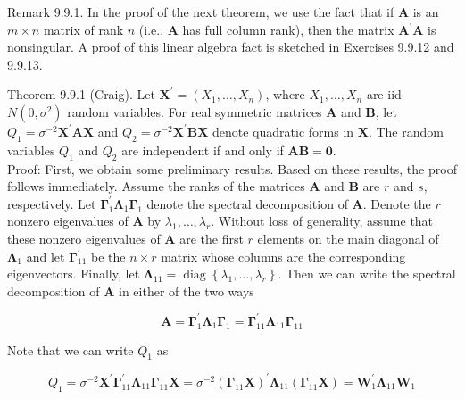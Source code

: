 Remark 9.9.1. In the proof of the next theorem, we use the fact that if $\mathbf{A}$ is an $m \times n$ matrix of rank $n$ (i.e., $\mathbf{A}$ has full column rank), then the matrix $\mathbf{A}^{\prime} \mathbf{A}$ is nonsingular. A proof of this linear algebra fact is sketched in Exercises 9.9.12 and 9.9.13.

Theorem 9.9.1 (Craig). Let $\mathbf{X}^{\prime}=\left(X_{1}, \ldots, X_{n}\right)$, where $X_{1}, \ldots, X_{n}$ are iid $N\left(0, \sigma^{2}\right)$ random variables. For real symmetric matrices $\mathbf{A}$ and $\mathbf{B}$, let $Q_{1}=\sigma^{-2} \mathbf{X}^{\prime} \mathbf{A X}$ and $Q_{2}=\sigma^{-2} \mathbf{X}^{\prime} \mathbf{B X}$ denote quadratic forms in $\mathbf{X}$. The random variables $Q_{1}$ and $Q_{2}$ are independent if and only if $\mathbf{A B}=\mathbf{0}$.\\
Proof: First, we obtain some preliminary results. Based on these results, the proof follows immediately. Assume the ranks of the matrices $\mathbf{A}$ and $\mathbf{B}$ are $r$ and $s$, respectively. Let $\boldsymbol{\Gamma}_{1}^{\prime} \boldsymbol{\Lambda}_{1} \boldsymbol{\Gamma}_{1}$ denote the spectral decomposition of $\mathbf{A}$. Denote the $r$ nonzero eigenvalues of $\mathbf{A}$ by $\lambda_{1}, \ldots, \lambda_{r}$. Without loss of generality, assume that these nonzero eigenvalues of $\mathbf{A}$ are the first $r$ elements on the main diagonal of $\boldsymbol{\Lambda}_{1}$ and let $\boldsymbol{\Gamma}_{11}^{\prime}$ be the $n \times r$ matrix whose columns are the corresponding eigenvectors. Finally, let $\boldsymbol{\Lambda}_{11}=\operatorname{diag}\left\{\lambda_{1}, \ldots, \lambda_{r}\right\}$. Then we can write the spectral decomposition of $\mathbf{A}$ in either of the two ways


\begin{equation*}
\mathbf{A}=\boldsymbol{\Gamma}_{1}^{\prime} \boldsymbol{\Lambda}_{1} \boldsymbol{\Gamma}_{1}=\boldsymbol{\Gamma}_{11}^{\prime} \boldsymbol{\Lambda}_{11} \boldsymbol{\Gamma}_{11} \tag{9.9.1}
\end{equation*}


Note that we can write $Q_{1}$ as


\begin{equation*}
Q_{1}=\sigma^{-2} \mathbf{X}^{\prime} \boldsymbol{\Gamma}_{11}^{\prime} \boldsymbol{\Lambda}_{11} \boldsymbol{\Gamma}_{11} \mathbf{X}=\sigma^{-2}\left(\boldsymbol{\Gamma}_{11} \mathbf{X}\right)^{\prime} \boldsymbol{\Lambda}_{11}\left(\boldsymbol{\Gamma}_{11} \mathbf{X}\right)=\mathbf{W}_{1}^{\prime} \boldsymbol{\Lambda}_{11} \mathbf{W}_{1} \tag{9.9.2}
\end{equation*}


